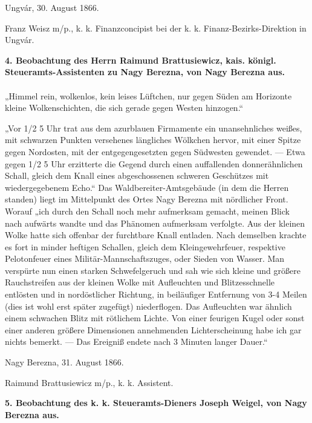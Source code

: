 \documentclass[a4paper, 11pt, oneside, german]{article}
\begin{document}
\hspace*{10mm}Ungvár, 30. August 1866.

\hspace*{15mm}Franz Weisz m/p., k. k. Finanzconcipist bei der k. k. Finanz-Bezirks-Direktion in Ungvár.
\begin{center}
\textbf{4. Beobachtung des Herrn Raimund Brattusiewicz, kais. königl. Steueramts-Assistenten zu Nagy Berezna, von Nagy Berezna aus.}
\end{center}
\paragraph{}
„Himmel rein, wolkenlos, kein leises Lüftchen, nur gegen Süden am Horizonte kleine Wolkenschichten, die sich gerade gegen Westen hinzogen.“

„Vor 1/2 5 Uhr trat aus dem azurblauen Firmamente ein unansehnliches weißes, mit schwarzen Punkten versehenes längliches Wölkchen hervor, mit einer Spitze gegen Nordosten, mit der entgegengesetzten gegen Südwesten gewendet. --- Etwa gegen 1/2 5 Uhr erzitterte die Gegend durch einen auffallenden donnerähnlichen Schall, gleich dem Knall eines abgeschossenen schweren Geschützes mit wiedergegebenem Echo.“ Das Waldbereiter-Amtsgebäude (in dem die Herren standen) liegt im Mittelpunkt des Ortes Nagy Berezna mit nördlicher Front. Worauf „ich durch den Schall noch mehr aufmerksam gemacht, meinen Blick nach aufwärts wandte und das Phänomen aufmerksam verfolgte. Aus der kleinen Wolke hatte sich offenbar der furchtbare Knall entladen. Nach demselben krachte es fort in minder heftigen Schallen, gleich dem Kleingewehrfeuer, respektive Pelotonfeuer eines Militär-Mannschaftszuges, oder Sieden von Wasser. Man verspürte nun einen starken Schwefelgeruch und sah wie sich kleine und größere Rauchstreifen aus der kleinen Wolke mit Aufleuchten und Blitzesschnelle entlösten und in nordöstlicher Richtung, in beiläufiger Entfernung von 3-4 Meilen (dies ist wohl erst später zugefügt) niederflogen. Das Aufleuchten war ähnlich einem schwachen Blitz mit rötlichem Lichte. Von einer feurigen Kugel oder sonst einer anderen größere Dimensionen annehmenden Lichterscheinung habe ich gar nichts bemerkt. --- Das Ereigniß endete nach 3 Minuten langer Dauer.“

\hspace*{10mm}Nagy Berezna, 31. August 1866.

\hspace*{15mm}Raimund Brattusiewicz m/p., k. k. Assistent.
\begin{center}
\textbf{5. Beobachtung des k. k. Steueramts-Dieners Joseph Weigel, von Nagy Berezna aus.}
\end{center}
\end{document}
